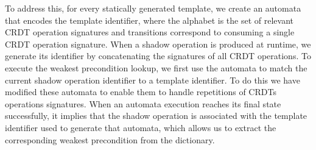 %

To address this, for every statically generated template, we create an automata that encodes the template identifier, where the alphabet is the set of relevant CRDT operation signatures and transitions correspond to consuming a single CRDT operation signature. When a shadow operation is produced at runtime, we generate its identifier by concatenating the signatures of all CRDT operations. To execute the weakest precondition lookup, we first use the automata to match the current shadow operation identifier to a template identifier. To do this we have modified these automata to enable them to handle repetitions of CRDTs operations signatures. When an automata execution reaches its final state successfully, it implies that the shadow operation is associated with the template identifier used to generate that automata, which allows us to extract the corresponding weakest precondition from the dictionary.


